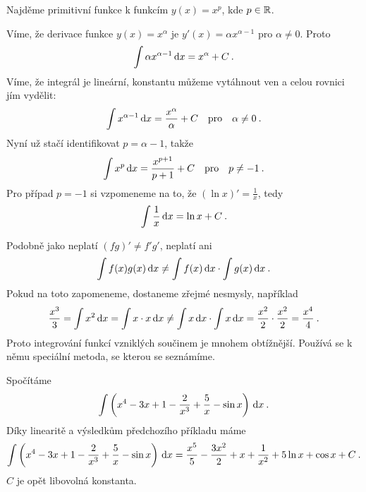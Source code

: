 \begin{example}
    Najděme primitivní funkce k funkcím $y(x) = x^p$, kde $p \in \mathbb{R}$.
    
    Víme, že derivace funkce $y(x) = x^\alpha$ je $y'(x) = \alpha x^{\alpha - 1}$ pro $\alpha \neq 0$. Proto \begin{align}
        \int \alpha x^{\alpha - 1} \, \mathrm{d} x = x^\alpha + C\:.
    \end{align}
    Víme, že integrál je lineární, konstantu můžeme vytáhnout ven a celou rovnici jím vydělit:
    \begin{align}
        \int x^{\alpha - 1} \, \mathrm{d} x = \frac{x^\alpha}{\alpha} +C \quad \text{pro} \quad \alpha \neq 0 \:.
    \end{align}
    Nyní už stačí identifikovat $p = \alpha - 1$, takže \begin{align}
        \int x^p \, \mathrm{d} x = \frac{x^{p+1}}{p+1} + C\quad \text{pro} \quad p \neq -1 \:.
    \end{align}
    Pro případ $p = -1$ si vzpomeneme na to, že $(\ln x)' = \frac{1}{x}$, tedy
    \begin{align}
        \int \frac{1}{x} \, \mathrm{d} x = \ln x + C \:.
    \end{align}
\end{example}

\begin{example}[Varování]
    Podobně jako neplatí $(fg)' \neq f' g'$, neplatí ani \begin{align}
        \int f(x) g(x) \, \mathrm{d} x \neq \int f(x) \, \mathrm{d} x \cdot \int g(x) \, \mathrm{d} x \:.
    \end{align}
    Pokud na toto zapomeneme, dostaneme zřejmé nesmysly, například \begin{align}
        \frac{x^3}{3} = \int x^2 \, \mathrm{d} x = \int x \cdot x \, \mathrm{d} x 
        \neq \int x \, \mathrm{d} x \cdot \int x \, \mathrm{d} x = \frac{x^2}{2} \cdot \frac{x^2}{2} = \frac{x^4}{4} \:.
    \end{align}
    Proto integrování funkcí vzniklých součinem je mnohem obtížnější. Používá se k němu speciální metoda, se kterou se seznámíme.
\end{example}

\begin{example}
    Spočítáme \begin{align}
        \int \left( x^4 - 3x + 1 - \frac{2}{x^3} + \frac{5}{x} - \sin x \right) \, \mathrm{d} x \:.
    \end{align}
    Díky linearitě a výsledkům předchozího příkladu máme \begin{align}
        \int \left( x^4 - 3x + 1 - \frac{2}{x^3} + \frac{5}{x} - \sin x \right) \, \mathrm{d} x = \frac{x^5}{5} - \frac{3x^2}{2} + x + \frac{1}{x^2} + 5 \ln x + \cos x + C \:.
    \end{align}
    $C$ je opět libovolná konstanta.
\end{example}

